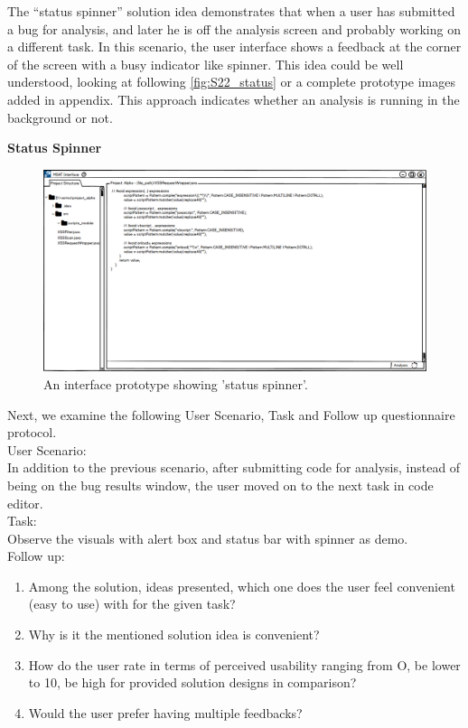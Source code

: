 The “status spinner” solution idea demonstrates that when a user has submitted a bug for analysis, and later he is off the analysis screen and probably working on a different task. In this scenario, the user interface shows a feedback at the corner of the screen with a busy indicator like spinner. This idea could be well understood, looking at following \autoref{fig:S22_status} or a complete prototype images added in appendix. This approach indicates whether an analysis is running in the background or not. \\

\clearpage

\textbf{Status Spinner}
\begin{figure}[hbt!]
	\centering
	\includegraphics[width=\linewidth]{figures/solution_ideas_snaps/S22_status}
	\caption{An interface prototype showing 'status spinner'.}
	\label{fig:S22_status}
\end{figure}

Next, we examine the following User Scenario, Task and Follow up questionnaire protocol. \\

User Scenario: \\

In addition to the previous scenario, after submitting code for analysis, instead of being on the bug results window, the user moved on to the next task in code editor. \\

Task: \\

Observe the visuals with alert box and status bar with spinner as demo. \\

Follow up: \\

\begin{enumerate}
\item Among the solution, ideas presented, which one does the user feel convenient (easy to use) with for the given task?
\item Why is it the mentioned solution idea is convenient?
\item How do the user rate in terms of perceived usability ranging from O, be lower to 10, be high for provided solution designs in comparison?
\item Would the user prefer having multiple feedbacks?
\end{enumerate}

